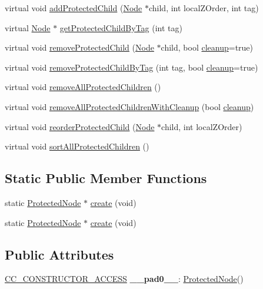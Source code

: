 \begin{Indent}
\begin{DoxyCompactItemize}
\item 
virtual void \hyperlink{classProtectedNode_a7c460eedbac4dbc3dbb88b6e087eab4b}{add\+Protected\+Child} (\hyperlink{classNode}{Node} $\ast$child, int local\+Z\+Order, int tag)
\item 
virtual \hyperlink{classNode}{Node} $\ast$ \hyperlink{classProtectedNode_a8ce823510d08580d4a8179ccf9aa1446}{get\+Protected\+Child\+By\+Tag} (int tag)
\item 
virtual void \hyperlink{classProtectedNode_a6e57c27ae8946caaa1a3ce4626742c4a}{remove\+Protected\+Child} (\hyperlink{classNode}{Node} $\ast$child, bool \hyperlink{classProtectedNode_a5462a6202b458193c1881bcdcc5be78d}{cleanup}=true)
\item 
virtual void \hyperlink{classProtectedNode_a72d22821af23262abe3da2c8fb1d47a2}{remove\+Protected\+Child\+By\+Tag} (int tag, bool \hyperlink{classProtectedNode_a5462a6202b458193c1881bcdcc5be78d}{cleanup}=true)
\item 
virtual void \hyperlink{classProtectedNode_a3442f092881a51775ec290a37e003652}{remove\+All\+Protected\+Children} ()
\item 
virtual void \hyperlink{classProtectedNode_ab28b415ead8bc9d1426567d75f6b6f0b}{remove\+All\+Protected\+Children\+With\+Cleanup} (bool \hyperlink{classProtectedNode_a5462a6202b458193c1881bcdcc5be78d}{cleanup})
\item 
virtual void \hyperlink{classProtectedNode_af208be19b66a59e33760f6f4075154f4}{reorder\+Protected\+Child} (\hyperlink{classNode}{Node} $\ast$child, int local\+Z\+Order)
\item 
virtual void \hyperlink{classProtectedNode_a6c714462d5e41ceda921eb39628056c1}{sort\+All\+Protected\+Children} ()
\end{DoxyCompactItemize}
\end{Indent}
\subsection*{Static Public Member Functions}
\begin{DoxyCompactItemize}
\item 
static \hyperlink{classProtectedNode}{Protected\+Node} $\ast$ \hyperlink{classProtectedNode_a9eaee8bebe7898590b919e3065413da9}{create} (void)
\item 
static \hyperlink{classProtectedNode}{Protected\+Node} $\ast$ \hyperlink{classProtectedNode_a7f96a27d935e5849b43d7412a09e9810}{create} (void)
\end{DoxyCompactItemize}
\subsection*{Public Attributes}
\begin{DoxyCompactItemize}
\item 
\mbox{\label{classProtectedNode_a2acbd05a453cf161aa8a3e4399d655db}} 
\hyperlink{_2cocos2d_2cocos_2base_2ccConfig_8h_a25ef1314f97c35a2ed3d029b0ead6da0}{C\+C\+\_\+\+C\+O\+N\+S\+T\+R\+U\+C\+T\+O\+R\+\_\+\+A\+C\+C\+E\+SS} {\bfseries \+\_\+\+\_\+pad0\+\_\+\+\_\+}\+: \hyperlink{classProtectedNode}{Protected\+Node}()
\end{DoxyCompactItemize}

